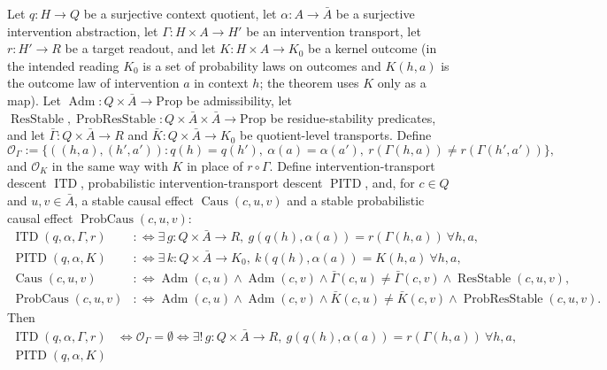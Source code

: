 \begin{theorem}\label{thm:F25}
Let \(q:H\to Q\) be a surjective context quotient, let
\(\alpha:A\to\bar A\) be a surjective intervention abstraction, let
\(\Gamma:H\times A\to H'\) be an intervention transport, let
\(r:H'\to R\) be a target readout, and let
\(K:H\times A\to K_0\) be a kernel outcome (in the intended reading \(K_0\) is a set of probability laws on outcomes and \(K(h,a)\) is the outcome law of intervention \(a\) in context \(h\); the theorem uses \(K\) only as a map).  Let
\(\operatorname{Adm}:Q\times\bar A\to\mathrm{Prop}\) be admissibility,
let
\(\operatorname{ResStable},\operatorname{ProbResStable}:
Q\times\bar A\times\bar A\to\mathrm{Prop}\) be residue-stability
predicates, and let \(\bar\Gamma:Q\times\bar A\to R\) and
\(\bar K:Q\times\bar A\to K_0\) be quotient-level transports.  Define
\[
  \mathcal O_{\Gamma}
  :=
  \{((h,a),(h',a')) :
    q(h)=q(h'),\ \alpha(a)=\alpha(a'),\
    r(\Gamma(h,a))\ne r(\Gamma(h',a'))\},
\]
and \(\mathcal O_K\) in the same way with \(K\) in place of
\(r\circ\Gamma\).  Define intervention-transport descent
\(\operatorname{ITD}\), probabilistic intervention-transport descent
\(\operatorname{PITD}\), and, for \(c\in Q\) and \(u,v\in\bar A\), a stable
causal effect \(\operatorname{Caus}(c,u,v)\) and a stable probabilistic
causal effect \(\operatorname{ProbCaus}(c,u,v)\):
\begin{align*}
  \operatorname{ITD}(q,\alpha,\Gamma,r)
  &:\Longleftrightarrow
  \exists\,g:Q\times\bar A\to R,\
    g(q(h),\alpha(a))=r(\Gamma(h,a))\ \forall h,a,\\
  \operatorname{PITD}(q,\alpha,K)
  &:\Longleftrightarrow
  \exists\,k:Q\times\bar A\to K_0,\
    k(q(h),\alpha(a))=K(h,a)\ \forall h,a,\\
  \operatorname{Caus}(c,u,v)
  &:\Longleftrightarrow
  \operatorname{Adm}(c,u)\wedge\operatorname{Adm}(c,v)
  \wedge\bar\Gamma(c,u)\ne\bar\Gamma(c,v)
  \wedge\operatorname{ResStable}(c,u,v),\\
  \operatorname{ProbCaus}(c,u,v)
  &:\Longleftrightarrow
  \operatorname{Adm}(c,u)\wedge\operatorname{Adm}(c,v)
  \wedge\bar K(c,u)\ne\bar K(c,v)
  \wedge\operatorname{ProbResStable}(c,u,v).
\end{align*}
Then
\begin{align*}
  \operatorname{ITD}(q,\alpha,\Gamma,r)
  &\iff \mathcal O_{\Gamma}=\emptyset
  \iff
  \exists!\,g:Q\times\bar A\to R,\
    g(q(h),\alpha(a))=r(\Gamma(h,a))\ \forall h,a,\\
  \operatorname{PITD}(q,\alpha,K)

\end{align*}
\end{theorem}
